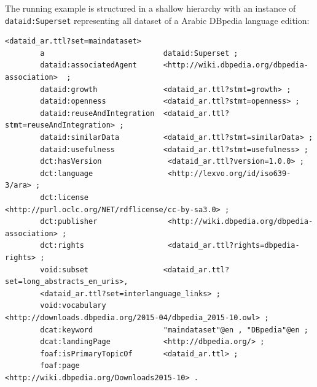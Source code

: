 \documentclass[a4paper,english,twoside,BCOR1.5cm,headsepline,DIV12,appendixprefix,final,12pt]{scrbook}
\newcommand{\prop}[1]{{{\texttt{#1}}}}
\begin{document}
The running example is structured in a shallow hierarchy with an instance of \prop{dataid:Superset} representing all dataset of a Arabic DBpedia language edition:
\\
\begin{lstlisting}[language=ttl, captionpos=b,caption=Instance of a Superset,label=lst:coresuperset,linewidth=\columnwidth,breaklines=true]
<dataid_ar.ttl?set=maindataset>
        a                           dataid:Superset ;
        dataid:associatedAgent      <http://wiki.dbpedia.org/dbpedia-association>  ;
        dataid:growth               <dataid_ar.ttl?stmt=growth> ;                                                 
        dataid:openness             <dataid_ar.ttl?stmt=openness> ;
        dataid:reuseAndIntegration  <dataid_ar.ttl?stmt=reuseAndIntegration> ;
        dataid:similarData          <dataid_ar.ttl?stmt=similarData> ;
        dataid:usefulness           <dataid_ar.ttl?stmt=usefulness> ;
        dct:hasVersion               <dataid_ar.ttl?version=1.0.0> ;
        dct:language                 <http://lexvo.org/id/iso639-3/ara> ;                                          
        dct:license                  <http://purl.oclc.org/NET/rdflicense/cc-by-sa3.0> ;  
        dct:publisher                <http://wiki.dbpedia.org/dbpedia-association> ;
        dct:rights                   <dataid_ar.ttl?rights=dbpedia-rights> ;
        void:subset                 <dataid_ar.ttl?set=long_abstracts_en_uris>, 
        <dataid_ar.ttl?set=interlanguage_links> ;
        void:vocabulary             <http://downloads.dbpedia.org/2015-04/dbpedia_2015-10.owl> ;                  
        dcat:keyword                "maindataset"@en , "DBpedia"@en ;
        dcat:landingPage            <http://dbpedia.org/> ;                                                       
        foaf:isPrimaryTopicOf       <dataid_ar.ttl> ;                                                             
        foaf:page                   <http://wiki.dbpedia.org/Downloads2015-10> .  
\end{lstlisting}
\end{document}
